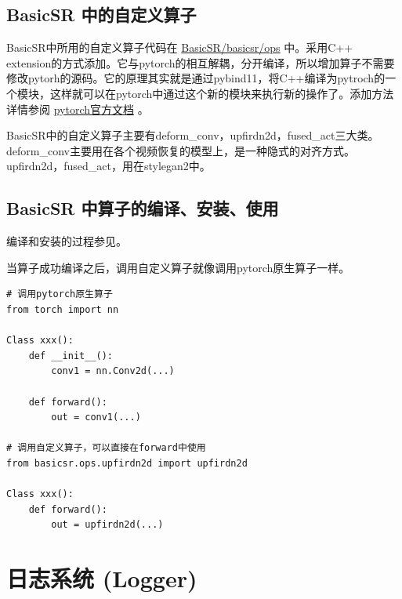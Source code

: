 \documentclass[../main.tex]{subfiles}
\begin{document}
\subsection{BasicSR 中的自定义算子}

BasicSR中所用的自定义算子代码在 \href{https://github.com/XPixelGroup/BasicSR/tree/master/basicsr/ops}{BasicSR/basicsr/ops} 中。采用C++ extension的方式添加。它与pytorch的相互解耦，分开编译，所以增加算子不需要修改pytorh的源码。它的原理其实就是通过pybind11，将C++编译为pytroch的一个模块，这样就可以在pytorch中通过这个新的模块来执行新的操作了。添加方法详情参阅 \href{https://pytorch.org/tutorials/advanced/cpp_extension.html#writing-a-mixed-c-cuda-extension}{pytorch官方文档} 。

BasicSR中的自定义算子主要有deform\_conv，upfirdn2d，fused\_act三大类。deform\_conv主要用在各个视频恢复的模型上，是一种隐式的对齐方式。upfirdn2d，fused\_act，用在stylegan2中。

\subsection{BasicSR 中算子的编译、安装、使用}

\begin{note} %
    编译和安装的过程参见\label{installation:c++}。
\end{note}

当算子成功编译之后，调用自定义算子就像调用pytorch原生算子一样。


\begin{verbatim}
# 调用pytorch原生算子
from torch import nn

Class xxx():
    def __init__():
        conv1 = nn.Conv2d(...)

    def forward():
        out = conv1(...)

# 调用自定义算子，可以直接在forward中使用
from basicsr.ops.upfirdn2d import upfirdn2d

Class xxx():
    def forward():
        out = upfirdn2d(...)

\end{verbatim}

\section{日志系统 (Logger)} \label{code_structure:logger}
\end{document}
